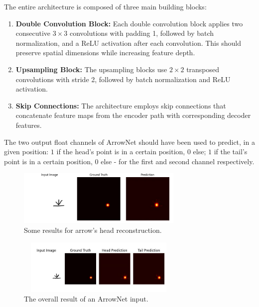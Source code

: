 \documentclass[conference]{IEEEtran}
\begin{document}
\begin{appendices}
The entire architecture is composed of three main building blocks:

\begin{enumerate}
\item \textbf{Double Convolution Block:} Each double convolution block applies two consecutive $3 \times 3$ convolutions with padding 1, followed by batch normalization, and a ReLU activation after each convolution. This should preserve spatial dimensions while increasing feature depth.

\item \textbf{Upsampling Block:} The upsampling blocks use $2 \times 2$ transposed convolutions with stride 2, followed by batch normalization and ReLU activation.

\item \textbf{Skip Connections:} The architecture employs skip connections that concatenate feature maps from the encoder path with corresponding decoder features.

\end{enumerate}

The two output float channels of ArrowNet should have been used to predict, in a given position: $1$ if the head's point is in a certain position, $0$ else; $1$ if the tail's point is in a certain position, $0$ else - for the first and second channel respectively.

\begin{figure}[H]
	\centering
	\includegraphics[width=225pt, height=75pt]{arrownet1.jpg}
	\caption{Some results for arrow's head reconstruction.}
	\label{fig:arrownet1}
\end{figure}

\begin{figure}[H]
	\centering
	\includegraphics[width=225pt, height=75pt]{arrownet2.jpg}
	\caption{The overall result of an ArrowNet input.}
	\label{fig:arrownet2}
\end{figure}


\end{appendices}
\end{document}
